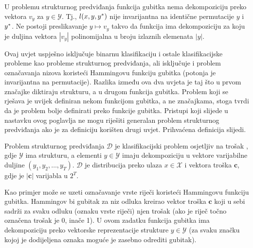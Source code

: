 \begin{condition}\label{uvjet2}

  U problemu strukturnog predviđanja funkcija gubitka nema dekompoziciju preko
  vektora $v_y$ za $y \in \mathcal{Y}$. Tj., $l(x, y, y\ssymbol{1})$ nije
  invarijantna na identične permutacije $y$ i $y\ssymbol{1}$. Ne postoji
  preslikavanje $y \mapsto v_y$ takvo da funkcija ima dekompoziciju za koju je
  duljina vektora $|v_y|$ polinomijalna u broju izlaznih elemenata $|y|$.

\end{condition}

\noindent
Ovaj uvjet uspješno isključuje binarnu klasifikaciju i ostale klasifikacijske
probleme kao probleme strukturnog predviđanja, ali isključuje i problem
označavanja nizova koristeći Hammingovu funkciju gubitka (potonja je
invarijantna na permutacije). Razlika između ova dva uvjeta je taj što u prvom
značajke diktiraju strukturu, a u drugom funkcija gubitka. Problem koji se
rješava je uvijek definiran nekom funkcijom gubitka, a ne značajkama, stoga
\citeauthor{daume06thesis} tvrdi da je problem bolje definirati preko funkcije
gubitka. Pristupi koji slijede u nastavku ovog poglavlja ne mogu riješiti
generalan problem strukturnog predviđanja ako je za definiciju korišten drugi
uvjet. Prihvaćena definicija slijedi.

\begin{definition} \label{def:jointlearn}

  Problem strukturnog predviđanja $\mathcal{D}$ je klasifikacijski problem
  osjetljiv na trošak , gdje
  $\mathcal{Y}$ ima strukturu, a elementi $y \in \mathcal{Y}$ imaju
  dekompoziciju u vektore varijabilne duljine $(y_1, y_2, \ldots, y_T)$.
  $\mathcal{D}$ je distribucija preko ulaza $x \in \mathcal{X}$ i vektora troška
  $\mathbf{c}$, gdje je $|\mathbf{c}|$ varijabla u $2^T$.

\end{definition}

\noindent
Kao primjer može se uzeti označavanje vrste riječi koristeći Hammingovu funkciju
gubitka. Hammingov bi gubitak za niz odluka kreirao vektor troška $\mathbf{c}$
koji u sebi sadrži za svaku odluku (oznaku vrste riječi) njen trošak (ako je
riječ točno označena trošak je 0, inače 1). U ovom zadatku funkcija gubitka ima
dekompoziciju preko vektorske reprezentacije strukture $y \in \mathcal{Y}$ (za
svaku značku kojoj je dodijeljena oznaka moguće je zasebno odrediti gubitak).

